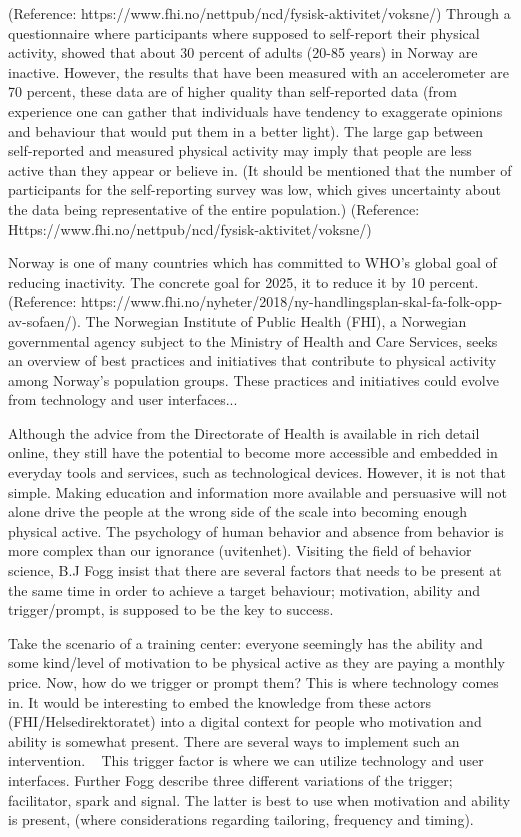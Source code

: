 (Reference: https://www.fhi.no/nettpub/ncd/fysisk-aktivitet/voksne/) Through a questionnaire where participants where supposed to self-report their physical activity, showed that about 30 percent of adults (20-85 years) in Norway are inactive. However, the results that have been measured with an accelerometer are 70 percent, these data are of higher quality than self-reported data (from experience one can gather that individuals have tendency to exaggerate opinions and behaviour that would put them in a better light). The large gap between self-reported and measured physical activity may imply that people are less active than they appear or believe in. (It should be mentioned that the number of participants for the self-reporting survey was low, which gives uncertainty about the data being representative of the entire population.) (Reference: Https://www.fhi.no/nettpub/ncd/fysisk-aktivitet/voksne/)

Norway is one of many countries which has committed to WHO's global goal of reducing inactivity. The concrete goal for 2025, it to reduce it by 10 percent. (Reference: https://www.fhi.no/nyheter/2018/ny-handlingsplan-skal-fa-folk-opp-av-sofaen/). The Norwegian Institute of Public Health (FHI), a Norwegian governmental agency subject to the Ministry of Health and Care Services, seeks an overview of best practices and initiatives that contribute to physical activity among Norway's population groups. 
These practices and initiatives could evolve from technology and user interfaces...

Although the advice from the Directorate of Health is available in rich detail online, they still have the potential to become more accessible and embedded in everyday tools and services, such as technological devices. However, it is not that simple. Making education and information more available and persuasive will not alone drive the people at the wrong side of the scale into becoming enough physical active. The psychology of human behavior and absence from behavior is more complex than our ignorance (uvitenhet). Visiting the field of behavior science, B.J Fogg insist that there are several factors that needs to be present at the same time in order to achieve a target behaviour; motivation, ability and trigger/prompt, is supposed to be the key to success. 

Take the scenario of a training center: everyone seemingly has the ability and some kind/level of motivation to be physical active as they are paying a monthly price. Now, how do we trigger or prompt them?  This is where technology comes in. It would be interesting to embed the knowledge from these actors (FHI/Helsedirektoratet) into a digital context for people who motivation and ability is somewhat present. There are several ways to implement such an intervention. 
 
This trigger factor is where we can utilize technology and user interfaces. Further Fogg describe three different variations of the trigger; facilitator, spark and signal. The latter is best to use when motivation and ability is present, (where considerations regarding tailoring, frequency and timing).

